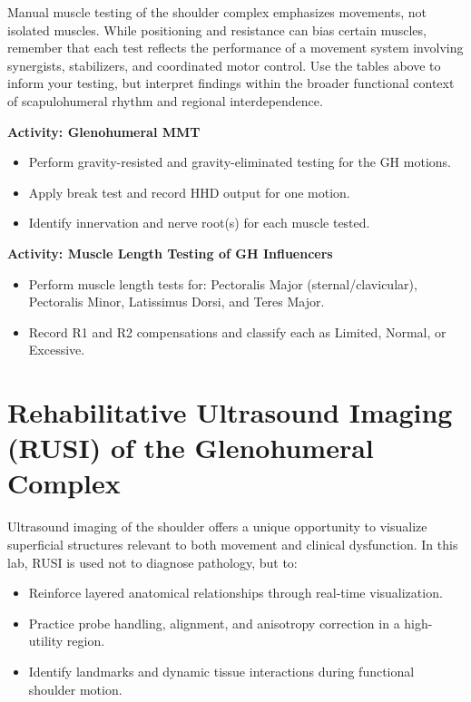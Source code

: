 \begin{tcolorbox}[colback=gray!5, colframe=black, title={Final Reminder: Movement, Not Muscle Isolation}]
Manual muscle testing of the shoulder complex emphasizes movements, not isolated muscles. While positioning and resistance can bias certain muscles, remember that each test reflects the performance of a movement system involving synergists, stabilizers, and coordinated motor control. Use the tables above to inform your testing, but interpret findings within the broader functional context of scapulohumeral rhythm and regional interdependence.
\end{tcolorbox}


\begin{labactivitybox}
\textbf{Activity: Glenohumeral MMT}
\begin{itemize}
  \item Perform gravity-resisted and gravity-eliminated testing for the GH motions.
  \item Apply break test and record HHD output for one motion.
  \item Identify innervation and nerve root(s) for each muscle tested.
\end{itemize}
\end{labactivitybox}

\begin{labactivitybox}
\textbf{Activity: Muscle Length Testing of GH Influencers}
\begin{itemize}
  \item Perform muscle length tests for: Pectoralis Major (sternal/clavicular), Pectoralis Minor, Latissimus Dorsi, and Teres Major.
  \item Record R1 and R2 compensations and classify each as Limited, Normal, or Excessive.
\end{itemize}
\end{labactivitybox}


\section*{Rehabilitative Ultrasound Imaging (RUSI) of the Glenohumeral Complex}

Ultrasound imaging of the shoulder offers a unique opportunity to visualize superficial structures relevant to both movement and clinical dysfunction. In this lab, RUSI is used not to diagnose pathology, but to:

\begin{itemize}
  \item Reinforce layered anatomical relationships through real-time visualization.
  \item Practice probe handling, alignment, and anisotropy correction in a high-utility region.
  \item Identify landmarks and dynamic tissue interactions during functional shoulder motion.
\end{itemize}

